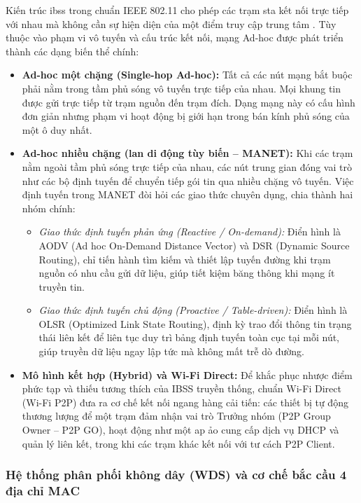 Kiến trúc \ac{ibss} trong chuẩn IEEE 802.11 cho phép các trạm \ac{sta} kết nối trực tiếp với nhau mà không cần sự hiện diện của một điểm truy cập trung tâm \cite{gast2005, kurose2012, cisco_intro_80211, hcmus_wlan_report}. Tùy thuộc vào phạm vi vô tuyến và cấu trúc kết nối, mạng Ad-hoc được phát triển thành các dạng biến thể chính:
\begin{itemize}
  \item \textbf{Ad-hoc một chặng (Single-hop Ad-hoc):} Tất cả các nút mạng bắt buộc phải nằm trong tầm phủ sóng vô tuyến trực tiếp của nhau. Mọi khung tin được gửi trực tiếp từ trạm nguồn đến trạm đích. Dạng mạng này có cấu hình đơn giản nhưng phạm vi hoạt động bị giới hạn trong bán kính phủ sóng của một ô duy nhất.
  \item \textbf{Ad-hoc nhiều chặng (\acl{lan} di động tùy biến -- MANET):} Khi các trạm nằm ngoài tầm phủ sóng trực tiếp của nhau, các nút trung gian đóng vai trò như các bộ định tuyến để chuyển tiếp gói tin qua nhiều chặng vô tuyến. Việc định tuyến trong MANET đòi hỏi các giao thức chuyên dụng, chia thành hai nhóm chính:
    \begin{itemize}[leftmargin=1.5em]
      \item \emph{Giao thức định tuyến phản ứng (Reactive / On-demand):} Điển hình là AODV (Ad hoc On-Demand Distance Vector) và DSR (Dynamic Source Routing), chỉ tiến hành tìm kiếm và thiết lập tuyến đường khi trạm nguồn có nhu cầu gửi dữ liệu, giúp tiết kiệm băng thông khi mạng ít truyền tin.
      \item \emph{Giao thức định tuyến chủ động (Proactive / Table-driven):} Điển hình là OLSR (Optimized Link State Routing), định kỳ trao đổi thông tin trạng thái liên kết để liên tục duy trì bảng định tuyến toàn cục tại mỗi nút, giúp truyền dữ liệu ngay lập tức mà không mất trễ dò đường.
    \end{itemize}
  \item \textbf{Mô hình kết hợp (Hybrid) và Wi-Fi Direct:} Để khắc phục nhược điểm phức tạp và thiếu tương thích của IBSS truyền thống, chuẩn Wi-Fi Direct (Wi-Fi P2P) đưa ra cơ chế kết nối ngang hàng cải tiến: các thiết bị tự động thương lượng để một trạm đảm nhận vai trò Trưởng nhóm (P2P Group Owner -- P2P GO), hoạt động như một \ac{ap} ảo cung cấp dịch vụ DHCP và quản lý liên kết, trong khi các trạm khác kết nối với tư cách P2P Client.
\end{itemize}

\subsubsection{Hệ thống phân phối không dây (WDS) và cơ chế bắc cầu 4 địa chỉ MAC}

